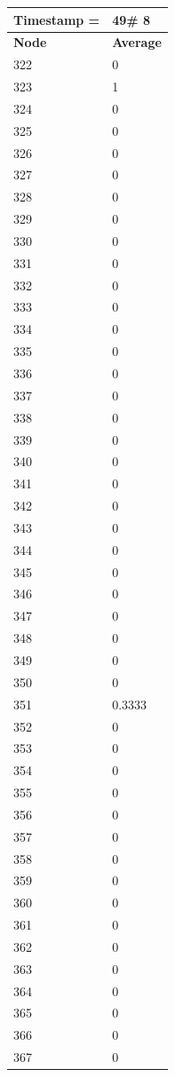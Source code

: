 \begin{tabular}{|l||l|}
\hline
\textbf{Timestamp =} & \textbf{49}\# 8\\\hline
	\textbf{Node} & \textbf{Average} \\ \hline
\hline
	322 & 0 \\ \hline
	323 & 1 \\ \hline
	324 & 0 \\ \hline
	325 & 0 \\ \hline
	326 & 0 \\ \hline
	327 & 0 \\ \hline
	328 & 0 \\ \hline
	329 & 0 \\ \hline
	330 & 0 \\ \hline
	331 & 0 \\ \hline
	332 & 0 \\ \hline
	333 & 0 \\ \hline
	334 & 0 \\ \hline
	335 & 0 \\ \hline
	336 & 0 \\ \hline
	337 & 0 \\ \hline
	338 & 0 \\ \hline
	339 & 0 \\ \hline
	340 & 0 \\ \hline
	341 & 0 \\ \hline
	342 & 0 \\ \hline
	343 & 0 \\ \hline
	344 & 0 \\ \hline
	345 & 0 \\ \hline
	346 & 0 \\ \hline
	347 & 0 \\ \hline
	348 & 0 \\ \hline
	349 & 0 \\ \hline
	350 & 0 \\ \hline
	351 & 0.3333 \\ \hline
	352 & 0 \\ \hline
	353 & 0 \\ \hline
	354 & 0 \\ \hline
	355 & 0 \\ \hline
	356 & 0 \\ \hline
	357 & 0 \\ \hline
	358 & 0 \\ \hline
	359 & 0 \\ \hline
	360 & 0 \\ \hline
	361 & 0 \\ \hline
	362 & 0 \\ \hline
	363 & 0 \\ \hline
	364 & 0 \\ \hline
	365 & 0 \\ \hline
	366 & 0 \\ \hline
	367 & 0 \\ \hline
\end{tabular}
